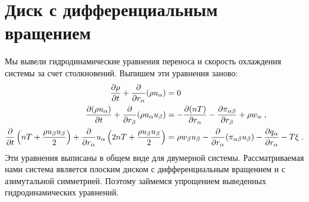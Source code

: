 \chapter{Диск с дифференциальным вращением}
\label{cha:impl}

 Мы вывели гидродинамические уравнения переноса и скорость охлаждения системы за счет столкновений.
 Выпишем эти уравнения заново:
 \begin{equation}
    \begin{split}
        \frac{\partial\rho}{\partial t}+\frac{\partial}{\partial r_{\alpha}}(\rho u_{\alpha}) &=0\;\\
        \frac{\partial(\rho u_{\alpha})}{\partial t} + \frac{\partial}{\partial r_{\beta}}(\rho u_{\alpha}u_{\beta}) 
        &= -\frac{\partial (nT)}{\partial r_{\alpha}}-\frac{\partial\pi_{\alpha\beta}}{\partial r_{\beta}}+\rho w_{\alpha}\;,\\
        \frac{\partial}{\partial t}\left(nT+\frac{\rho u_{\beta}u_{\beta}}{2}\right) + \frac{\partial}{\partial r_{\alpha}}u_{\alpha}
        \left(2nT+\frac{\rho u_{\beta}u_{\beta}}{2}\right) &= \rho w_{\beta}u_{\beta}-\frac{\partial}{\partial r_{\alpha}}(\pi_{\alpha\beta}u_{\beta})
        -\frac{\partial q_{\alpha}}{\partial r_{\alpha}}-T\xi\;.
    \end{split}
\end{equation}
Эти уравнения выписаны в общем виде для двумерной системы. Рассматриваемая нами система является плоским диском
с дифференциальным вращением и с азимутальной симметрией. Поэтому займемся упрощением выведенных гидродинамических уравнений.

